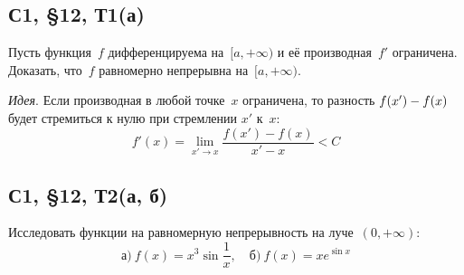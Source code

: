 \documentclass[a4paper,12pt]{article}
\begin{document}
  
  
  
  \subsection{С1, \S 12, Т1(а)}
  
  Пусть функция~$f$ дифференцируема на~$[a, +\infty)$ и её производная~$f'$ ограничена.
  Доказать, что~$f$ равномерно непрерывна на~$[a, +\infty)$.
  
  \begin{solution}
    \emph{Идея}.
    Если производная в любой точке~$x$ ограничена, то разность $f(x') \hm- f(x)$ будет стремиться к нулю при стремлении $x'$ к~$x$:
    \[
      f'(x) = \lim_{x' \to x} \frac{f(x') - f(x)}{x' - x} < C
    \]
  \end{solution}
  
  
  
  \subsection{С1, \S 12, Т2(а, б)}
  
  Исследовать функции на равномерную непрерывность на луче~$(0, +\infty)$:
  \[
    \mbox{а})\ f(x) = x^3 \sin{\frac{1}{x}},\quad \mbox{б})\ f(x) = x e^{\sin x}
  \]
  
  \begin{solution}
  
  \end{solution}
  
\end{document}
